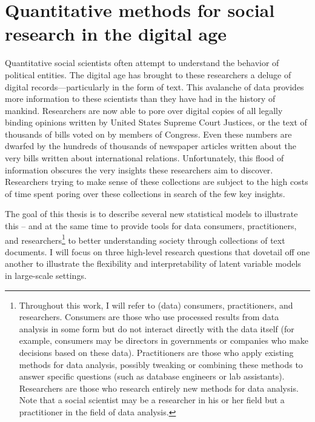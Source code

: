 \chapter{Quantitative methods for social research in the digital age}

Quantitative social scientists often attempt to understand the
behavior of political entities.  The digital age has brought to these
researchers a deluge of digital records---particularly in the form of
text.  This avalanche of data provides more information to these
scientists than they have had in the history of mankind.  Researchers
are now able to pore over digital copies of all legally binding
opinions written by United States Supreme Court Justices, or the text
of thousands of bills voted on by members of Congress.  Even these
numbers are dwarfed by the hundreds of thousands of newspaper articles
written about the very bills written about international relations.
Unfortunately, this flood of information obscures the very insights
these researchers aim to discover.  Researchers trying to make sense
of these collections are subject to the high costs of time spent
poring over these collections in search of the few key insights.

The goal of this thesis is to describe several new statistical models
to illustrate this -- and at the same time to provide tools for data
consumers, practitioners, and researchers\footnote{Throughout this
  work, I will refer to (data) consumers, practitioners, and
  researchers.  Consumers are those who use processed results from
  data analysis in some form but do not interact directly with the
  data itself (for example, consumers may be directors in governments
  or companies who make decisions based on these data).  Practitioners
  are those who apply existing methods for data analysis, possibly
  tweaking or combining these methods to answer specific questions
  (such as database engineers or lab assistants). Researchers are
  those who research entirely new methods for data analysis.  Note
  that a social scientist may be a researcher in his or her field but
  a practitioner in the field of data analysis.} to better
understanding society through collections of text documents.  I will
focus on three high-level research questions that dovetail off one
another to illustrate the flexibility and interpretability of latent
variable models in large-scale settings.

